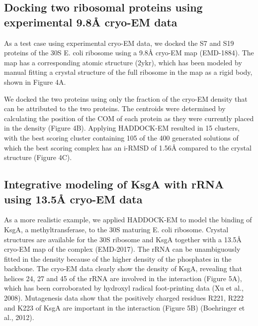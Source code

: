 \subsection{Docking two ribosomal proteins using experimental 9.8Å cryo-EM data}

As a test case using experimental cryo-EM data, we docked the S7 and S19 proteins of the 30S E. coli ribosome using a 9.8Å cryo-EM map (EMD-1884). The map has a corresponding atomic structure (2ykr), which has been modeled by manual fitting a crystal structure of the full ribosome in the map as a rigid body, shown in Figure 4A.

We docked the two proteins using only the fraction of the cryo-EM density that can be attributed to the two proteins. The centroids were determined by calculating the position of the COM of each protein as they were currently placed in the density (Figure 4B). Applying HADDOCK-EM resulted in 15 clusters, with the best scoring cluster containing 105 of the 400 generated solutions of which the best scoring complex has an i-RMSD of 1.56Å compared to the crystal structure (Figure 4C). 

\subsection{Integrative modeling of KsgA with rRNA using 13.5Å cryo-EM data}

As a more realistic example, we applied HADDOCK-EM to model the binding of KsgA, a methyltransferase, to the 30S maturing E. coli ribosome. Crystal structures are available for the 30S ribosome and KsgA together with a 13.5Å cryo-EM map of the complex (EMD-2017). The rRNA can be unambiguously fitted in the density because of the higher density of the phosphates in the backbone. The cryo-EM data clearly show the density of KsgA, revealing that helices 24, 27 and 45 of the rRNA are involved in the interaction (Figure 5A), which has been corroborated by hydroxyl radical foot-printing data (Xu et al., 2008). Mutagenesis data show that the positively charged residues R221, R222 and K223 of KsgA are important in the interaction (Figure 5B) (Boehringer et al., 2012).


